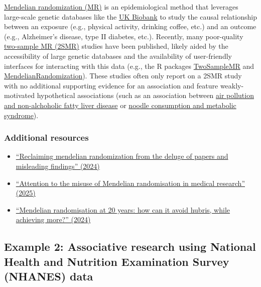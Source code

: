 \documentclass[letterpaper, 12pt]{article}
\begin{document}
\href{https://doi.org/10.1038/s43586-021-00092-5}{Mendelian randomization (MR)} is an epidemiological method that leverages large-scale genetic databases like the \href{https://www.ukbiobank.ac.uk/}{UK Biobank} to study the causal relationship between an exposure (e.g., physical activity, drinking coffee, etc.) and an outcome (e.g., Alzheimer's disease, type II diabetes, etc.). Recently, many poor-quality \href{https://doi.org/10.1093/ije/dyx028}{two-sample MR (2SMR)} studies have been published, likely aided by the accessibility of large genetic databases and the availability of user-friendly interfaces for interacting with this data (e.g., the R packages \href{https://doi.org/10.7554/eLife.34408}{TwoSampleMR} and \href{https://doi.org/10.12688/wellcomeopenres.19995.2}{MendelianRandomization}). These studies often only report on a 2SMR study with no additional supporting evidence for an association and feature weakly-motivated hypothetical associations (such as an association between \href{http://dx.doi.org/10.3389/fendo.2024.1396032}{air pollution and non-alchoholic fatty liver disease} or \href{http://dx.doi.org/10.3390/nu15092091}{noodle consumption and metabolic syndrome}).

\subsubsection*{Additional resources}

\begin{itemize}
    \setlength\itemsep{-0.5em}
    \item \href{https://doi.org/10.1186/s12944-024-02284-w}{``Reclaiming mendelian randomization from the deluge of papers and misleading findings'' (2024)}
    \item \href{https://doi.org/10.1136/egastro-2025-100187}{``Attention to the misuse of Mendelian randomisation in medical research'' (2025)}
    \item \href{https://doi.org/10.1016/S2213-8587(23)00348-0}{``Mendelian randomisation at 20 years: how can it avoid hubris, while achieving more?'' (2024)}
\end{itemize}

\subsection*{Example 2: Associative research using National Health and Nutrition Examination Survey (NHANES) data}
\end{document}
